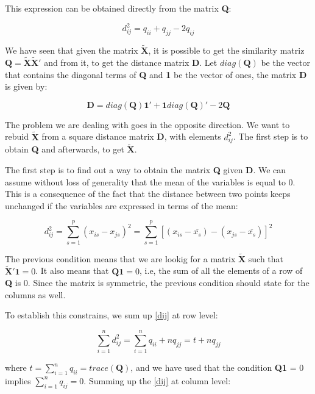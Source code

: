 \documentclass[11pt]{report}
\begin{document}
\indent This expression can be obtained directly from the matrix \textbf{Q}:

\begin{equation} \label{dfromq}
d^2_{ij} = q_{ii} + q_{jj} - 2q_{ij}
\end{equation}

\indent We have seen that given the matrix $\mathbf{\widetilde{X}}$, it is possible to
get the similarity matriz $\mathbf{Q} = \mathbf{\widetilde{X}}\mathbf{\widetilde{X}'}$
and from it, to get the distance matrix \textbf{D}. Let $diag(\mathbf{Q})$ be the
vector that contains the diagonal terms of \textbf{Q} and \textbf{1} be the vector
of ones, the matrix \textbf{D} is given by:

$$\mathbf{D} = diag(\mathbf{Q}) \mathbf{1}' + \mathbf{1}diag(\mathbf{Q})' - 2\mathbf{Q}$$

\indent The problem we are dealing with goes in the opposite direction. We want to rebuid
$\mathbf{\widetilde{X}}$ from a square distance matrix \textbf{D}, with elements
$d_{ij}^2$. The first step is to obtain \textbf{Q} and afterwards, to get 
$\mathbf{\widetilde{X}}$.

\indent The first step is to find out a way to obtain the matrix \textbf{Q} given
\textbf{D}. We can assume without loss of generality that the mean of the variables
is equal to 0. This is a consequence of the fact that the distance between two points
keeps unchanged if the variables are expressed in terms of the mean:


\begin{equation} \label{dtraslated}
d_{ij}^2 = \sum_{s = 1}^p (x_{is} - x_{js})^2 = \sum_{s=1} ^p [(x_{is} - \overline{x_s})- (x_{js} - \overline{x_s})]^2
\end{equation}

\indent The previous condition means that we are lookig for a matrix  $\mathbf{\widetilde{X}}$
such that $\mathbf{\widetilde{X}'}\mathbf{1} = 0$. It also means that $\mathbf{Q}\mathbf{1} = 0$,
i.e, the sum of all the elements of a row of \textbf{Q} is 0. Since the matrix is 
symmetric, the previous condition should state for the columns as well. 

\indent To establish this constrains, we sum up \ref{dij} at row level:

\begin{equation} \label{sumrows}
\sum_{i = 1}^n d_{ij}^2 = \sum_{i = 1}^n q_{ii} + nq_{jj} = t + nq_{jj}
\end{equation}

where $t = \sum_{i = 1}^n q_{ii} = trace(\mathbf{Q})$, and we have used that the
condition \textbf{Q}\textbf{1} = 0 implies $\sum_{i = 1}^n q_{ij} = 0$. Summing 
up the \ref{dij} at column level:
\end{document}
